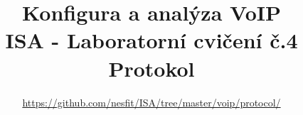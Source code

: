 \documentclass[a4paper,11pt]{article}
\title{Konfigura a analýza VoIP\\
{\bf\large ISA - Laboratorní cvičení č.4}\\
{\bf\large Protokol}}
\author{\url{https://github.com/nesfit/ISA/tree/master/voip/protocol/}}
\date{}
\begin{document}
{\let\newpage\relax\maketitle}



\end{document}
